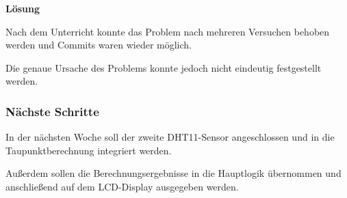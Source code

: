 \textbf{Lösung}

Nach dem Unterricht konnte das Problem nach mehreren
Versuchen behoben werden und Commits waren wieder möglich.

Die genaue Ursache des Problems konnte jedoch nicht
eindeutig festgestellt werden.

\subsubsection{Nächste Schritte}

In der nächsten Woche soll der zweite DHT11-Sensor
angeschlossen und in die Taupunktberechnung integriert
werden.

Außerdem sollen die Berechnungsergebnisse in die
Hauptlogik übernommen und anschließend auf dem
LCD-Display ausgegeben werden.
